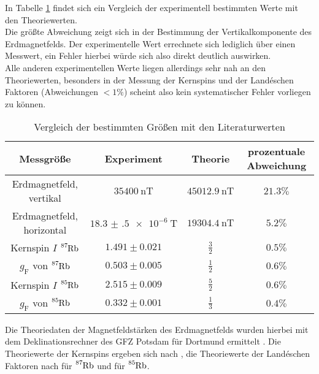 In Tabelle \ref{tab:discuss} findet sich ein Vergleich der experimentell bestimmten Werte mit den Theoriewerten.\\
Die größte Abweichung zeigt sich in der Bestimmung der Vertikalkomponente des Erdmagnetfelds. Der experimentelle Wert errechnete sich lediglich über einen Messwert, ein Fehler hierbei würde sich also direkt deutlich auswirken.\\
Alle anderen experimentellen Werte liegen allerdings sehr nah an den Theoriewerten, besonders in der Messung der Kernspins und der Landéschen Faktoren (Abweichungen $<1\%$) scheint also kein systematischer Fehler vorliegen zu können.\\
\begin{table}
  \caption{Vergleich der bestimmten Größen mit den Literaturwerten}
  \label{tab:discuss}
 \centering
 \begin{tabular}{cccc}
   \toprule
Messgröße&Experiment&Theorie&prozentuale Abweichung\\
\midrule
Erdmagnetfeld, vertikal&$\SI{35400}{\nano\tesla}$&$\SI{45012.9}{\nano\tesla}$&$21.3\%$\\
Erdmagnetfeld, horizontal&$\SI{18.3(5)e-6}{\tesla}$&$\SI{19304.4}{\nano\tesla}$&$5.2\%$\\
Kernspin $I$ $\ce{^87Rb}$&$1.491\pm0.021$&$\frac{3}{2}$&$0.5\%$\\
$g_{\mathrm{F}}$ von $\ce{^87Rb}$&$0.503\pm0.005$&$\frac{1}{2}$&$0.6\%$\\
Kernspin $I$ $\ce{^85Rb}$&$2.515\pm0.009$&$\frac{5}{2}$&$0.6\%$\\
$g_{\mathrm{F}}$ von $\ce{^85Rb}$&$0.332\pm0.001$&$\frac{1}{3}$&$0.4\%$\\
\bottomrule
\end{tabular}
\end{table}
Die Theoriedaten der Magnetfeldstärken des Erdmagnetfelds wurden hierbei mit dem Deklinationsrechner des GFZ Potsdam für Dortmund ermittelt \cite{dekli}.
Die Theoriewerte der Kernspins ergeben sich nach \cite{muenster}, die Theoriewerte der Landéschen Faktoren nach \cite{gf} für $\ce{^87Rb}$ und \cite{gf2} für $\ce{^85Rb}$.
